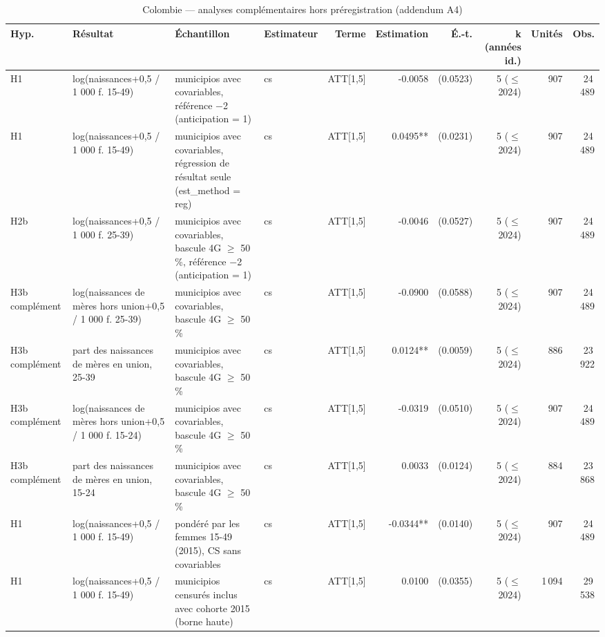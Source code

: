 \begin{table}\centering
\begin{threeparttable}
\caption{Colombie — analyses complémentaires hors préregistration (addendum A4)}\label{tab:co_exploratory}
\scriptsize
\begin{tabular}{lp{5.2cm}p{6.2cm}lrrrrrr}
\toprule
Hyp. & Résultat & Échantillon & Estimateur & Terme & Estimation & É.-t. & k (années id.) & Unités & Obs. \\
\midrule
H1 & log(naissances+0,5 / 1 000 f. 15-49) & municipios avec covariables, référence $-$2 (anticipation = 1) & cs & ATT[1,5] & -0.0058 & (0.0523) & 5 ($\leq$ 2024) & 907 & 24\,489 \\
H1 & log(naissances+0,5 / 1 000 f. 15-49) & municipios avec covariables, régression de résultat seule (est\_method = reg) & cs & ATT[1,5] & 0.0495** & (0.0231) & 5 ($\leq$ 2024) & 907 & 24\,489 \\
H2b & log(naissances+0,5 / 1 000 f. 25-39) & municipios avec covariables, bascule 4G $\geq$ 50 \%, référence $-$2 (anticipation = 1) & cs & ATT[1,5] & -0.0046 & (0.0527) & 5 ($\leq$ 2024) & 907 & 24\,489 \\
H3b complément & log(naissances de mères hors union+0,5 / 1 000 f. 25-39) & municipios avec covariables, bascule 4G $\geq$ 50 \% & cs & ATT[1,5] & -0.0900 & (0.0588) & 5 ($\leq$ 2024) & 907 & 24\,489 \\
H3b complément & part des naissances de mères en union, 25-39 & municipios avec covariables, bascule 4G $\geq$ 50 \% & cs & ATT[1,5] & 0.0124** & (0.0059) & 5 ($\leq$ 2024) & 886 & 23\,922 \\
H3b complément & log(naissances de mères hors union+0,5 / 1 000 f. 15-24) & municipios avec covariables, bascule 4G $\geq$ 50 \% & cs & ATT[1,5] & -0.0319 & (0.0510) & 5 ($\leq$ 2024) & 907 & 24\,489 \\
H3b complément & part des naissances de mères en union, 15-24 & municipios avec covariables, bascule 4G $\geq$ 50 \% & cs & ATT[1,5] & 0.0033 & (0.0124) & 5 ($\leq$ 2024) & 884 & 23\,868 \\
H1 & log(naissances+0,5 / 1 000 f. 15-49) & pondéré par les femmes 15-49 (2015), CS sans covariables & cs & ATT[1,5] & -0.0344** & (0.0140) & 5 ($\leq$ 2024) & 907 & 24\,489 \\
H1 & log(naissances+0,5 / 1 000 f. 15-49) & municipios censurés inclus avec cohorte 2015 (borne haute) & cs & ATT[1,5] & 0.0100 & (0.0355) & 5 ($\leq$ 2024) & 1\,094 & 29\,538 \\
\bottomrule

\end{tabular}
\end{threeparttable}
\end{table}
